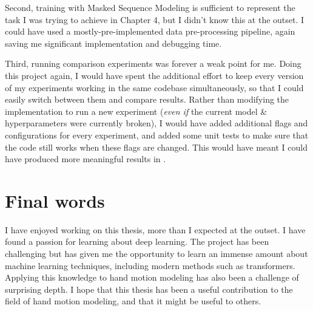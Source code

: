 Second, training with Masked Sequence Modeling is sufficient to represent the task I was trying to achieve in Chapter 4, but I didn't know this at the outset. I could have used a mostly-pre-implemented data pre-processing pipeline, again saving me significant implementation and debugging time.

Third, running comparison experiments was forever a weak point for me. Doing this project again, I would have spent the additional effort to keep every version of my experiments working in the same codebase simultaneously, so that I could easily switch between them and compare results. Rather than modifying the implementation to run a new experiment (\textit{even if} the current model \& hyperparameters were currently broken), I would have added additional flags and configurations for every experiment, and added some unit tests to make sure that the code still works when these flags are changed.  This would have meant I could have produced more meaningful results in .

\section{Final words}

I have enjoyed working on this thesis, more than I expected at the outset. I have found a passion for learning about deep learning. The project has been challenging but has given me the opportunity to learn an immense amount about machine learning techniques, including modern methods such as transformers. Applying this knowledge to hand motion modeling has also been a challenge of surprising depth. I hope that this thesis has been a useful contribution to the field of hand motion modeling, and that it might be useful to others.
